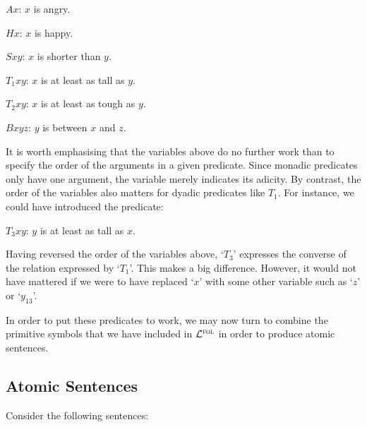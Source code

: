 \begin{ekey}[leftmargin=.7in]
  \begin{multicols}{2}
  \item[$Ax$:] $x$ is angry.
  \item[$Hx$:] $x$ is happy.
  \item[$Sxy$:] $x$ is shorter than $y$.
  \item[$T_1xy$:] $x$ is at least as tall as $y$.
  \item[$T_2xy$:] $x$ is at least as tough as $y$.
  \item[$Bxyz$:] $y$ is between $x$ and $z$.
  \end{multicols}
\end{ekey}

It is worth emphasising that the variables above do no further work than to specify the order of the arguments in a given predicate. 
Since monadic predicates only have one argument, the variable merely indicates its adicity.
By contrast, the order of the variables also matters for dyadic predicates like $T_1$.
For instance, we could have introduced the predicate:

\begin{ekey}[leftmargin=.7in]
  \item[$T_3xy$:] $y$ is at least as tall as $x$.
\end{ekey}

Having reversed the order of the variables above, `$T_3$' expresses the converse of the relation expressed by `$T_1$'.
This makes a big difference.
However, it would not have mattered if we were to have replaced `$x$' with some other variable such as `$z$' or `$y_{13}$'.

In order to put these predicates to work, we may now turn to combine the primitive symbols that we have included in $\mathcal{L}^{\textsc{fol}}$ in order to produce atomic sentences.





\subsection{Atomic Sentences}

Consider the following sentences:

\begin{earg} \label{hamlet}
\end{earg}

